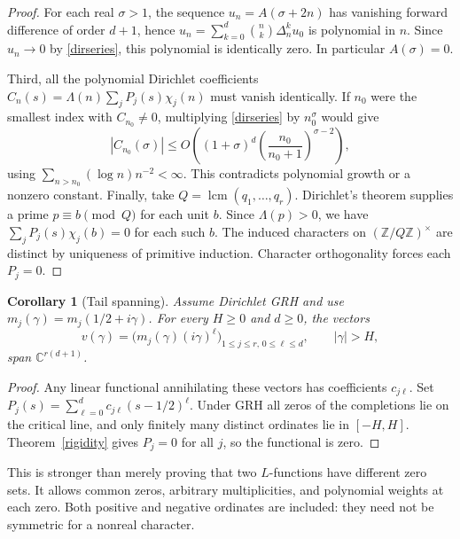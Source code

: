 \documentclass[11pt]{article}
\newtheorem{corollary}[theorem]{Corollary}
\theoremstyle{remark}\newtheorem{remark}[theorem]{Remark}
\newcommand{\C}{\mathbb C}\newcommand{\R}{\mathbb R}\newcommand{\dd}{\mathrm d}\newcommand{\Rea}{\operatorname{Re}}\newcommand{\ord}{\operatorname{ord}}\newcommand{\diag}{\operatorname{diag}}\newcommand{\Span}{\operatorname{span}}
\begin{document}
\begin{proof}
For each real $\sigma>1$, the sequence $u_n=A(\sigma+2n)$ has vanishing forward difference of order $d+1$, hence $u_n=\sum_{k=0}^d\binom nk\Delta_n^k u_0$ is polynomial in $n$. Since $u_n\to0$ by \eqref{dirseries}, this polynomial is identically zero. In particular $A(\sigma)=0$.

Third, all the polynomial Dirichlet coefficients $C_n(s)=\Lambda(n)\sum_j P_j(s)\chi_j(n)$ must vanish identically. If $n_0$ were the smallest index with $C_{n_0}\ne0$, multiplying \eqref{dirseries} by $n_0^\sigma$ would give
\[
 |C_{n_0}(\sigma)|\le O\left((1+\sigma)^d
 \left(\frac{n_0}{n_0+1}\right)^{\sigma-2}\right),
\]
using $\sum_{n>n_0}(\log n)n^{-2}<\infty$. This contradicts polynomial growth or a nonzero constant. Finally, take $Q=\operatorname{lcm}(q_1,\dots,q_r)$. Dirichlet's theorem supplies a prime $p\equiv b\pmod Q$ for each unit $b$. Since $\Lambda(p)>0$, we have $\sum_jP_j(s)\chi_j(b)=0$ for each such $b$. The induced characters on $(\mathbb Z/Q\mathbb Z)^\times$ are distinct by uniqueness of primitive induction. Character orthogonality forces each $P_j=0$.
\end{proof}

\begin{corollary}[Tail spanning]\label{tail}
Assume Dirichlet GRH and use $m_j(\gamma)=m_j(1/2+i\gamma)$. For every $H\ge0$ and $d\ge0$, the vectors
\[
 v(\gamma)=\big(m_j(\gamma)(i\gamma)^\ell\big)_{1\le j\le r,\,0\le\ell\le d},
 \qquad |\gamma|>H,
\]
span $\C^{r(d+1)}$.
\end{corollary}
\begin{proof}
Any linear functional annihilating these vectors has coefficients $c_{j\ell}$. Set $P_j(s)=\sum_{\ell=0}^dc_{j\ell}(s-1/2)^\ell$. Under GRH all zeros of the completions lie on the critical line, and only finitely many distinct ordinates lie in $[-H,H]$. Theorem~\ref{rigidity} gives $P_j=0$ for all $j$, so the functional is zero.
\end{proof}
This is stronger than merely proving that two $L$-functions have different zero sets. It allows common zeros, arbitrary multiplicities, and polynomial weights at each zero. Both positive and negative ordinates are included: they need not be symmetric for a nonreal character.
\end{document}
